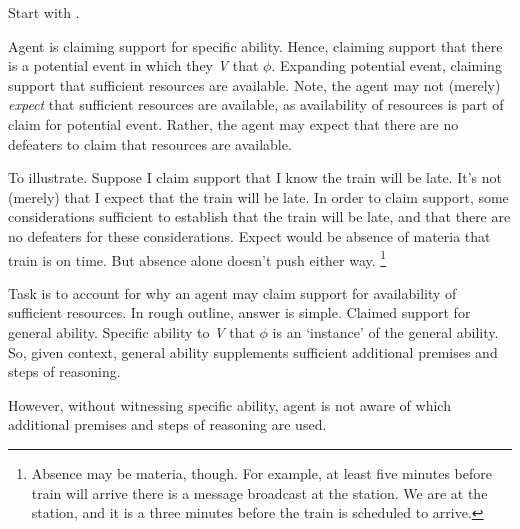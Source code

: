 \begin{note}
  Start with \gsi{}.

  Agent is claiming support for specific ability.
  Hence, claiming support that there is a potential event in which they \emph{V} that \(\phi\).
  Expanding potential event, claiming support that sufficient resources are available.
  Note, the agent may not (merely) \emph{expect} that sufficient resources are available, as availability of resources is part of claim for potential event.
  Rather, the agent may expect that there are no defeaters to claim that resources are available.

  To illustrate.
  Suppose I claim support that I know the train will be late.
  It's not (merely) that I expect that the train will be late.
  In order to claim support, some considerations sufficient to establish that the train will be late, and that there are no defeaters for these considerations.
  Expect would be absence of materia that train is on time.
  But absence alone doesn't push either way.\nolinebreak
  \footnote{
    Absence may be materia, though.
    For example, at least five minutes before train will arrive there is a message broadcast at the station.
    We are at the station, and it is a three minutes before the train is scheduled to arrive.
  }

  Task is to account for why an agent may claim support for availability of sufficient resources.
  In rough outline, answer is simple.
  Claimed support for general ability.
  Specific ability to \emph{V} that \(\phi\) is an `instance' of the general ability.
  So, given context, general ability supplements sufficient additional premises and steps of reasoning.

  However, without witnessing specific ability, agent is not aware of which additional premises and steps of reasoning are used.
\end{note}

